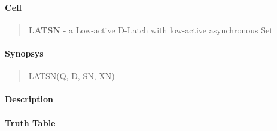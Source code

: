 \label{LATSN}
\paragraph{Cell}
\begin{quote}
    \textbf{LATSN} - a Low-active D-Latch with low-active asynchronous Set
\end{quote}

\paragraph{Synopsys}
\begin{quote}
    LATSN(Q, D, SN, XN)
\end{quote}

\paragraph{Description}

%

\paragraph{Truth Table}
%


